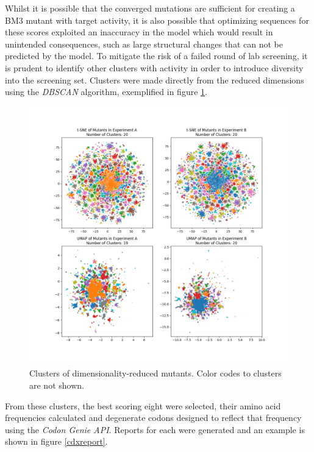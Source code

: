 \documentclass[16pt]{article}
\begin{document}
Whilst it is possible that the converged mutations are sufficient for creating a BM3 mutant with target activity, it is also possible that optimizing sequences for these scores exploited an inaccuracy in the model which would result in unintended consequences, such as large structural changes that can not be predicted by the model.
To mitigate the risk of a failed round of lab screening, it is prudent to identify other clusters with activity in order to introduce diversity into the screening set.
Clusters were made directly from the reduced dimensions using the \textit{DBSCAN} algorithm, exemplified in figure \ref{dimredclusters}.

\begin{figure}
	\includegraphics[width=\textwidth]{img/dimred-plt-clusters.png}
	\caption{\label{dimredclusters} Clusters of dimensionality-reduced mutants. Color codes to clusters are not shown.}
\end{figure}

From these clusters, the best scoring eight were selected, their amino acid frequencies calculated and degenerate codons designed to reflect that frequency using the \textit{Codon Genie API}.
Reports for each were generated and an example is shown in figure \ref{cdxreport}.
\end{document}
